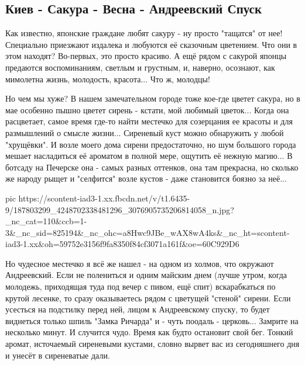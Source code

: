  
 
 
 
 
\subsection{Киев - Сакура - Весна - Андреевский Спуск}
\label{sec:20_05_2021.fb.storykievua.2.sakura}

Как известно, японские граждане любят сакуру -  ну просто "тащатся" от нее!
Специально приезжают издалека и любуются её сказочным цветением. Что они в этом
находят? Во-первых, это просто красиво. А ещё рядом с сакурой японцы предаются
воспоминаниям, светлым и грустным, и, наверно, осознают, как мимолетна жизнь,
молодость, красота... Что ж, молодцы!

Но чем мы хуже? В нашем замечательном городе тоже кое-где цветет сакура, но в
мае особенно пышно цветет сирень - кстати, мой любимый цветок... Когда она
расцветает, самое время где-то найти местечко для созерцания ее красоты и для
размышлений о смысле жизни... Сиреневый куст можно обнаружить у любой
"хрущёвки". И возле моего дома сирени предостаточно, но шум большого города
мешает насладиться её ароматом в полной мере, ощутить её нежную магию... В
ботсаду на Печерске она - самых разных оттенков, она там прекрасна, но сколько
же народу рыщет и "селфится" возле кустов - даже становится боязно за неё...

\ifcmt
  pic https://scontent-iad3-1.xx.fbcdn.net/v/t1.6435-9/187803299_4248702338481296_3076905735206814058_n.jpg?_nc_cat=110&ccb=1-3&_nc_sid=825194&_nc_ohc=a8Hwc9JBe_wAX8wA4ks&_nc_ht=scontent-iad3-1.xx&oh=59752e3156f9fa8350f84cf3071a161f&oe=60C929D6
\fi

Но чудесное местечко я всё же нашел - на одном из холмов, что окружают
Андреевский. Если не полениться и одним майским днем (лучше утром, когда
молодежь, приходящая туда под вечер с пивом, ещё спит) вскарабкаться по крутой
лесенке, то сразу оказываетесь рядом с цветущей "стеной" сирени. Если усесться
на подстилку перед ней, лицом к Андреевскому спуску, то будет виднеться только
шпиль "Замка Ричарда" и - чуть поодаль - церковь... Замрите на несколько минут.
И случится чудо.  Время как будто остановит свой бег. Тонкий аромат, источаемый
сиреневыми кустами, словно вырвет вас из сегодняшнего дня и унесёт в
сиреневатые дали.

